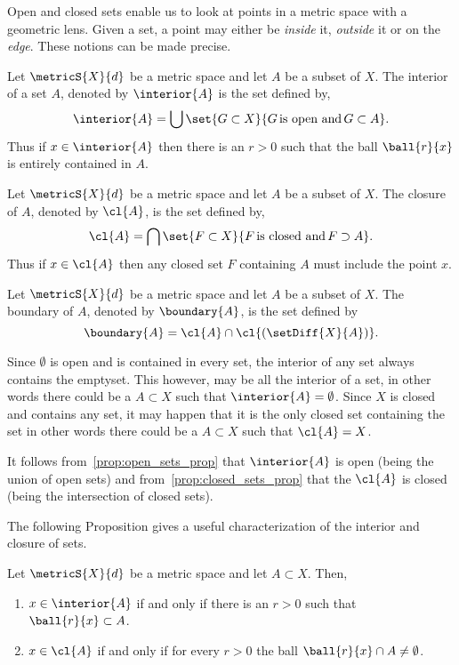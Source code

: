 Open and closed sets enable us to look at points in a metric space with a geometric lens. Given a set, a point
may either be \emph{inside} it, \emph{outside} it  or on the \emph{edge}. These notions can be made precise.
\begin{Definition}[name=Interior of a set]
    Let $\metricS{X}{d}$ be a metric space and let $A$ be a subset of $X$. The interior of a set $A$, denoted
    by $\interior{A}$ is the
    set defined by,
    \[\interior{A} = \bigcup\set{G\subset X}{G\,\text{is open and}\, G \subset A}.\]
    Thus if $x \in \interior{A}$ then there is an $r > 0$ such that the ball $\ball{r}{x}$ is entirely
    contained in $A$.
\end{Definition}
\begin{Definition}[name=Closure of a set]
    Let $\metricS{X}{d}$ be a metric space and let $A$ be a subset of $X$. The closure of $A$, denoted by
    $\cl{A}$, is the set defined by,
    \[\cl{A} = \bigcap\set{F\subset X}{F\,\text{is closed and}\, F\supset A}.\]
    Thus if $x\in \cl{A}$ then any closed set $F$ containing $A$ must include the point $x$.
\end{Definition}
\begin{Definition}[name=Boundary of a set]
    Let $\metricS{X}{d}$ be a metric space and let $A$ be a subset of $X$. The boundary of $A$, denoted by
    $\boundary{A}$, is the set defined by
    \[\boundary{A} = \cl{A}\cap\cl{(\setDiff{X}{A})}.\]
\end{Definition}
\begin{Remark}
    Since $\emptyset$ is open and is contained in every set, the interior of any set always contains the
    emptyset. This however, may be all the interior of a set, in other words there could be a $A \subset X$
    such that $\interior{A} = \emptyset$. Since $X$ is closed and contains any set, it may
    happen that it is the only closed set containing the set in other words there could be a $A \subset X$
    such that $\cl{A} = X$.

    It follows from~\ref{prop:open_sets_prop} that $\interior{A}$ is open (being the union of open sets) and
    from~\ref{prop:closed_sets_prop} that the
    $\cl{A}$ is closed (being the intersection of closed sets).
\end{Remark}
The following Proposition gives a useful characterization of the interior and closure of sets.
\begin{Proposition}\label{prop:characterization_int_closure}
    Let $\metricS{X}{d}$ be a metric space and let $A \subset X$. Then,
    \begin{enumerate}
	\item
	    $x \in \interior{A}$ if and only if there is an $r > 0$ such that $\ball{r}{x} \subset A$.
	\item
	    $x \in \cl{A}$ if and only if for every $r > 0$ the ball $\ball{r}{x}\cap A \neq \emptyset$.
    \end{enumerate}
\end{Proposition}
